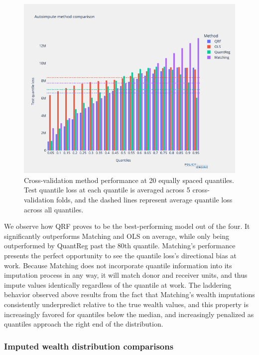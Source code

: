 \begin{figure}[h]
    \centering
    \includegraphics[width=\textwidth]{figures/quantile_loss_comparison.png}
    \caption{Cross-validation method performance at 20 equally spaced quantiles. Test quantile loss at each quantile is averaged across 5 cross-validation folds, and the dashed lines represent average quantile loss across all quantiles.}
    \label{fig:quantile_loss_comparison}
\end{figure}

We observe how QRF proves to be the best-performing model out of the four. It significantly outperforms Matching and OLS on average, while only being outperformed by QuantReg past the 80th quantile. Matching's performance presents the perfect opportunity to see the quantile loss's directional bias at work. Because Matching does not incorporate quantile information into its imputation process in any way, it will match donor and receiver units, and thus impute values identically regardless of the quantile at work. The laddering behavior observed above results from the fact that Matching's wealth imputations consistently underpredict relative to the true wealth values, and this property is increasingly favored for quantiles below the median, and increasingly penalized as quantiles approach the right end of the distribution. 

\subsubsection{Imputed wealth distribution comparisons}

